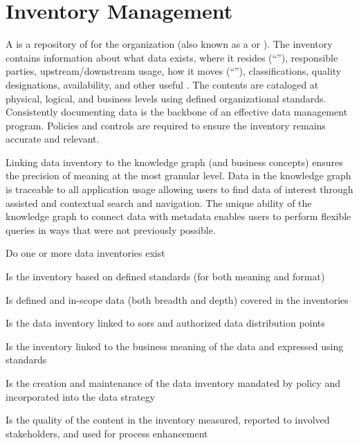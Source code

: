 \section{Inventory Management}\label{sec:ekg-mm-b-2-3} %

A  is a repository of  for the organization (also known as a
 or ).
The inventory contains information about what data exists, where it resides (“”),
responsible parties, upstream/downstream usage, how it moves (“”), classifications,
quality designations, availability, and other useful .
The contents are cataloged at physical, logical, and business levels using defined organizational standards.
Consistently documenting data is the backbone of an effective data management program.
Policies and controls are required to ensure the inventory remains accurate and relevant.

\ekgmmContextSection

Linking data inventory to the knowledge graph (and business concepts) ensures the precision of meaning at the most
granular level.
Data in the knowledge graph is traceable to all application usage allowing users to find data of interest through
assisted and contextual search and navigation.
The unique ability of the knowledge graph to connect data with metadata enables users to perform flexible queries
in ways that were not previously possible.

\kgmmcorequestionssection

\begin{core-questions}

  \item [\thesection.1] Do one or more data inventories exist
  \item [\thesection.2] Is the inventory based on defined standards (for both meaning and format)
  \item [\thesection.3] Is defined and in-scope data (both breadth and depth) covered in the inventories
  \item [\thesection.4] Is the data inventory linked to \glspl{sor} and authorized data distribution points
  \item [\thesection.5] Is the inventory linked to the business meaning of the data and expressed using standards
  \item [\thesection.6] Is the creation and maintenance of the data inventory mandated by policy and incorporated
                        into the data strategy
  \item [\thesection.7] Is the quality of the content in the inventory measured, reported to involved stakeholders,
                        and used for process enhancement

\end{core-questions}

